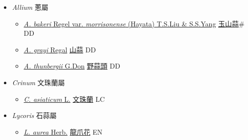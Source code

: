
  \begin{itemize}
 \item[] \textit{Allium} 蔥屬
                    
  \begin{itemize}
        \item[] \href{http://www.theplantlist.org/tpl1.1/search?q=Allium+bakeri+var.+morrisonense}{\textit{A. bakeri} Regel var. \textit{morrisonense} (Hayata) T.S.Liu \& S.S.Yang}   \href{\detokenize{http://taibnet.sinica.edu.tw/chi/taibnet_species_list.php?T2=玉山蒜&T2_new_value=true&fr=y}}{玉山蒜}\# DD
        \item[] \href{http://www.theplantlist.org/tpl1.1/search?q=Allium+grayi}{\textit{A. grayi} Regal}   \href{\detokenize{http://taibnet.sinica.edu.tw/chi/taibnet_species_list.php?T2=山蒜&T2_new_value=true&fr=y}}{山蒜} DD
        \item[] \href{http://www.theplantlist.org/tpl1.1/search?q=Allium+thunbergii}{\textit{A. thunbergii} G.Don}   \href{\detokenize{http://taibnet.sinica.edu.tw/chi/taibnet_species_list.php?T2=野蒜頭&T2_new_value=true&fr=y}}{野蒜頭} DD
  \end{itemize}
 \item[] \textit{Crinum} 文珠蘭屬
                    
  \begin{itemize}
        \item[] \href{http://www.theplantlist.org/tpl1.1/search?q=Crinum+asiaticum}{\textit{C. asiaticum} L.}   \href{\detokenize{http://taibnet.sinica.edu.tw/chi/taibnet_species_list.php?T2=文珠蘭&T2_new_value=true&fr=y}}{文珠蘭} LC
  \end{itemize}
 \item[] \textit{Lycoris} 石蒜屬
                    
  \begin{itemize}
        \item[] \href{http://www.theplantlist.org/tpl1.1/search?q=Lycoris+aurea}{\textit{L. aurea} Herb.}   \href{\detokenize{http://taibnet.sinica.edu.tw/chi/taibnet_species_list.php?T2=龍爪花&T2_new_value=true&fr=y}}{龍爪花} EN
  \end{itemize}
  \end{itemize}
